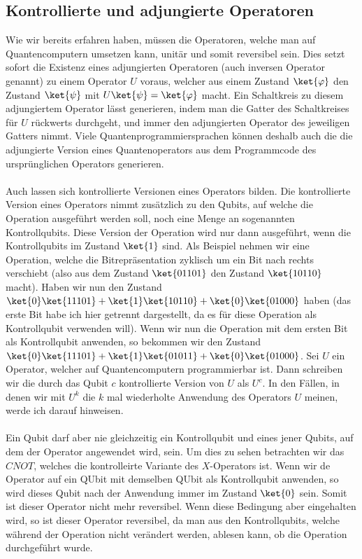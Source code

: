 \subsection{Kontrollierte und adjungierte Operatoren}
Wie wir bereits erfahren haben, müssen die Operatoren, welche man auf Quantencomputern umsetzen kann, unitär und somit reversibel sein. Dies setzt sofort die Existenz eines adjungierten Operatoren (auch inversen Operator genannt) zu einem Operator $U$ voraus, welcher aus einem Zustand $\ket{\varphi}$ den Zustand $\ket{\psi}$ mit $U\ket{\psi} = \ket{\varphi}$ macht. Ein Schaltkreis zu diesem adjungiertem Operator lässt generieren, indem man die Gatter des Schaltkreises für $U$ rückwerts durchgeht, und immer den adjungierten Operator des jeweiligen Gatters nimmt. Viele Quantenprogrammiersprachen können deshalb auch die die adjungierte Version eines Quantenoperators aus dem Programmcode des ursprünglichen Operators generieren.

\paragraph{}
Auch lassen sich kontrollierte Versionen eines Operators bilden. Die kontrollierte Version eines Operators nimmt zusätzlich zu den Qubits, auf welche die Operation ausgeführt werden soll, noch eine Menge an sogenannten Kontrollqubits. Diese Version der Operation wird nur dann ausgeführt, wenn die Kontrollqubits im Zustand $\ket{1}$ sind. Als Beispiel nehmen wir eine Operation, welche die Bitrepräsentation zyklisch um ein Bit nach rechts verschiebt (also aus dem Zustand $\ket{01101}$ den Zustand $\ket{10110}$ macht). Haben wir nun den Zustand $\ket{0}\ket{11101} + \ket{1}\ket{10110} + \ket{0}\ket{01000}$ haben (das erste Bit habe ich hier getrennt dargestellt, da es für diese Operation als Kontrollqubit verwenden will). Wenn wir nun die Operation mit dem ersten Bit als Kontrollqubit anwenden, so bekommen wir den Zustand $\ket{0}\ket{11101} + \ket{1}\ket{01011} + \ket{0}\ket{01000}$. Sei $U$ ein Operator, welcher auf Quantencomputern programmierbar ist. Dann schreiben wir die durch das Qubit $c$ kontrollierte Version von $U$ als $U^c$. In den Fällen, in denen wir mit $U^k$ die $k$ mal wiederholte Anwendung des Operators $U$ meinen, werde ich darauf hinweisen.

\paragraph{}

Ein Qubit darf aber nie gleichzeitig ein Kontrollqubit und eines jener Qubits, auf dem der Operator angewendet wird, sein. Um dies zu sehen betrachten wir das $CNOT$, welches die kontrolleirte Variante des $X$-Operators ist. Wenn wir de Operator auf ein QUbit mit demselben QUbit als Kontrollqubit anwenden, so wird dieses Qubit nach der Anwendung immer im Zustand $\ket{0}$ sein. Somit ist dieser Operator nicht mehr reversibel. Wenn diese Bedingung aber eingehalten wird, so ist dieser Operator reversibel, da man aus den Kontrollqubits, welche während der Operation nicht verändert werden, ablesen kann, ob die Operation durchgeführt wurde.

